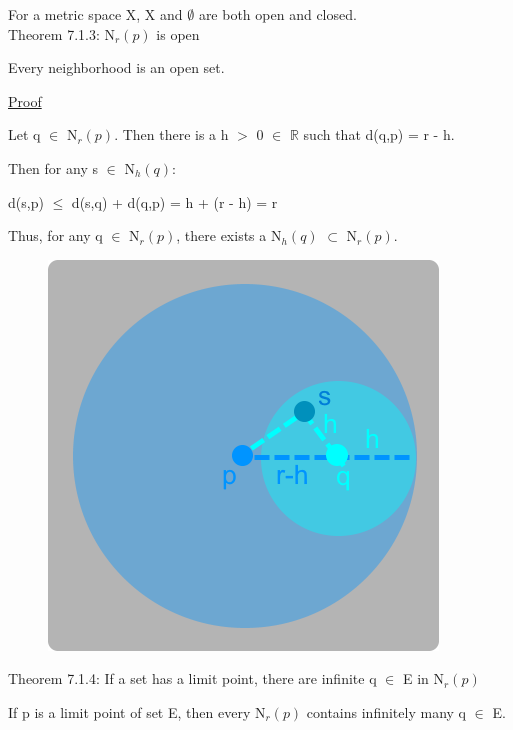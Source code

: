 	\qquad For a metric space X, X and $\emptyset$ are both open and closed. \\

{ \color{red} Theorem 7.1.3: N$_r(p)$ is open } 

	\begin{adjustbox}{minipage=14cm, right, vspace=0.1cm 0cm}
		Every neighborhood is an open set.
	\end{adjustbox}

{ \color{magenta} \underline{Proof} } 
	
	Let q $\in$ N$_r(p)$. Then there is a h $>$ 0 $\in$ $\mathbb{R}$
	such that d(q,p) = r - h.

	Then for any s $\in$ N$_h(q)$:

	\qquad d(s,p) $\leq$  d(s,q) + d(q,p) = h + (r - h) = r

	Thus, for any q $\in$ N$_r(p)$, there exists a N$_h(q)$ $\subset$ N$_r(p)$.

\begin{figure}[h]
	\centering
	\includegraphics[scale=0.36]{Images/7.1.3.png}
\end{figure}

\newpage

{ \color{red} Theorem 7.1.4: If a set has a limit point, there are infinite q
$\in$ E in N$_r(p)$ } 
	
	\begin{adjustbox}{minipage=14cm, right, vspace=0.1cm 0cm}
		If p is a limit point of set E, then every N$_r(p)$ contains infinitely many q $\in$ E.
	\end{adjustbox}

